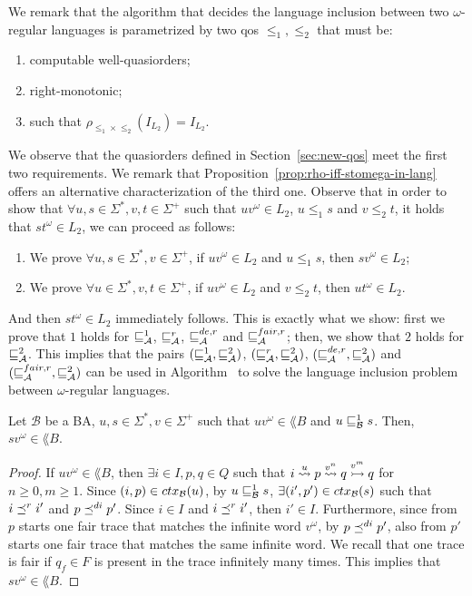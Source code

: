 We remark that the algorithm that decides the language inclusion between
two $\omega$-regular languages is parametrized by two qos $\leq_1,\leq_2$
that must be:
\begin{enumerate}
\item computable well-quasiorders;
\item right-monotonic;
\item such that $\rho_{\leq_1 \times \leq_2}(I_{L_2}) = I_{L_2}$.
\end{enumerate}
We observe that the quasiorders defined in Section~\ref{sec:new-qos} meet the first two
requirements.
We remark that Proposition~\ref{prop:rho-iff-stomega-in-lang} offers an alternative
characterization of the third one.
Observe that in order to show that $\forall u,s \in \Sigma^*, v,t \in \Sigma^+$
such that $uv ^{\omega} \in L_2$, $u \leq_1 s$ and $v \leq_2 t$,
it holds that $st ^{\omega} \in L_2$, we can proceed as follows:
\begin{enumerate}
\item We prove $\forall u,s \in \Sigma^*, v \in \Sigma^+$, if $uv ^{\omega} \in L_2$ and $u \leq_1 s$, then $sv ^{\omega} \in L_2$;
\item We prove $\forall u \in \Sigma^*, v,t \in \Sigma^+$, if $uv ^{\omega} \in L_2$ and $v \leq_2 t$, then $ut ^{\omega} \in L_2$.
\end{enumerate}
And then $st ^{\omega} \in L_2$ immediately follows.
This is exactly what we show: first we prove that $1$ holds for $\sqsubseteq^1_{\mathcal{A}}$,
$\sqsubseteq_{\mathcal{A}}^r$, $\sqsubseteq_{\mathcal{A}}^{de,r}$ and $\sqsubseteq_{\mathcal{A}}^{fair,r}$;
then, we show that $2$ holds for $\sqsubseteq_{\mathcal{A}}^{2}$.
This implies that the pairs $(\sqsubseteq^1_{\mathcal{A}}, \sqsubseteq_{\mathcal{A}}^{2})$, $(\sqsubseteq_{\mathcal{A}}^r, \sqsubseteq_{\mathcal{A}}^{2})$,
$(\sqsubseteq_{\mathcal{A}}^{de,r}, \sqsubseteq_{\mathcal{A}}^{2})$ and $(\sqsubseteq_{\mathcal{A}}^{fair,r}, \sqsubseteq_{\mathcal{A}}^{2})$ can be used in
Algorithm~ to solve the language inclusion problem between
$\omega$-regular languages.

\begin{proposition}
\label{proposition:wsdir-substitution}
Let $\mathcal{B}$ be a BA, $u,s \in \Sigma^*, v \in \Sigma^+$
such that $uv ^{\omega} \in \lang{B}$ and $u \sqsubseteq^1_{\mathcal{B}} s$.
Then, $sv ^{\omega} \in \lang{B}$.
\end{proposition}

\begin{proof}
If $uv ^{\omega} \in \lang{B}$, then $\exists i \in I, p,q \in Q$ such that
$i \overset{u}{\rightsquigarrow} p \overset{v^n}{\rightsquigarrow} q \overset{v^m}{\rightarrowtail} q$ for $n \geq 0, m \geq 1$.
Since $(i,p) \in ctx_{\mathcal{B}}(u)$, by $u \sqsubseteq^1_{\mathcal{B}} s$, $\exists (i',p') \in ctx_{\mathcal{B}}(s)$
such that $i \preceq^r i'$ and $p \preceq^{di} p'$.
Since $i \in I$ and $i \preceq^r i'$, then $i' \in I$.
Furthermore, since from $p$ starts one fair trace that matches the infinite word $v^{\omega}$,
by $p \preceq^{di} p'$, also from $p'$ starts one fair trace that matches the same infinite word.
We recall that one trace is fair if $q_f \in F$ is present in the trace infinitely
many times.
This implies that $sv ^{\omega} \in \lang{B}$.
\end{proof}

